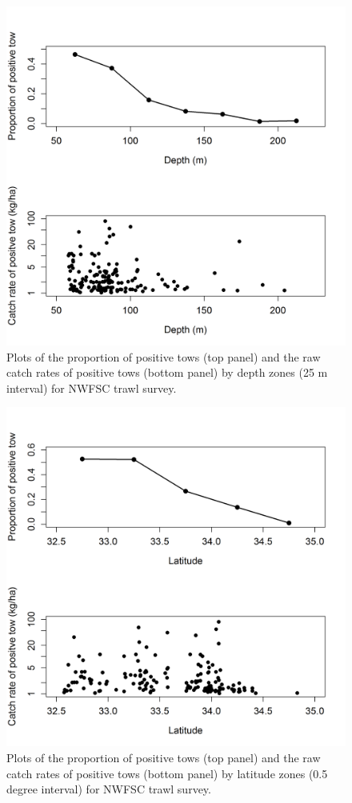 \documentclass[12pt,]{article}
\begin{document}
\begin{figure}[htbp]
\centering
\includegraphics{Figures/NWFSCtrawl_posdepth.png}
\caption{Plots of the proportion of positive tows (top panel) and the
raw catch rates of positive tows (bottom panel) by depth zones (25 m
interval) for NWFSC trawl survey.
\label{fig:Fleet8_NWFSCtrawl_posdepth}}
\end{figure}

\begin{figure}[htbp]
\centering
\includegraphics{Figures/NWFSCtrawl_poslat.png}
\caption{Plots of the proportion of positive tows (top panel) and the
raw catch rates of positive tows (bottom panel) by latitude zones (0.5
degree interval) for NWFSC trawl survey.
\label{fig:Fleet8_NWFSCtrawl_poslat}}
\end{figure}
\end{document}
